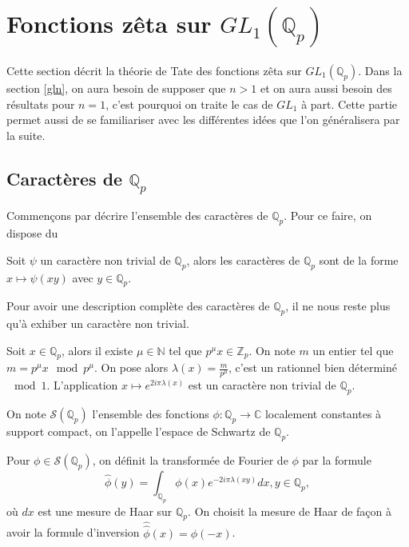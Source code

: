 \section{Fonctions zêta sur $GL_1(\mathbb{Q}_p)$}

Cette section décrit la théorie de Tate \cite{tate} des fonctions zêta sur $GL_1(\mathbb{Q}_p)$. Dans la section \ref{gln}, on aura besoin de supposer que $n > 1$ et on aura aussi besoin des résultats pour $n=1$, c'est pourquoi on traite le cas de $GL_1$ à part. Cette partie permet aussi de se familiariser avec les différentes idées que l'on généralisera par la suite.

\subsection{Caractères de $\mathbb{Q}_p$}
\label{caracqp}
Commençons par décrire l'ensemble des caractères de $\mathbb{Q}_p$. Pour ce faire, on dispose du

\begin{lemme}
Soit $\psi$ un caractère non trivial de $\mathbb{Q}_p$, alors les caractères de $\mathbb{Q}_p$ sont de la forme $x \mapsto \psi(xy)$ avec $y \in \mathbb{Q}_p$.
\end{lemme}

Pour avoir une description complète des caractères de $\mathbb{Q}_p$, il ne nous reste plus qu'à exhiber un caractère non trivial.

Soit $x \in \mathbb{Q}_p$, alors il existe $\mu \in \mathbb{N}$ tel que $p^\mu x \in \mathbb{Z}_p$. On note $m$ un entier tel que $m = p^\mu x \mod p^\mu$. On pose alors $\lambda(x) = \frac{m}{p^\mu}$, c'est un rationnel bien déterminé $\mod 1$. L'application $x \mapsto e^{2i\pi \lambda(x)}$ est un caractère non trivial de $\mathbb{Q}_p$.

On note $\mathcal{S}(\mathbb{Q}_p)$ l'ensemble des fonctions $\phi : \mathbb{Q}_p \rightarrow \mathbb{C}$ localement constantes à support compact, on l'appelle l'espace de Schwartz de $\mathbb{Q}_p$.

Pour $\phi \in \mathcal{S}(\mathbb{Q}_p)$, on définit la transformée de Fourier de $\phi$ par la formule
\begin{equation}
\hat{\phi}(y) = \int_{\mathbb{Q}_p} \phi(x) e^{-2i\pi \lambda(xy)}dx, y \in \mathbb{Q}_p,
\end{equation}
où $dx$ est une mesure de Haar sur $\mathbb{Q}_p$. On choisit la mesure de Haar de façon à avoir la formule d'inversion $\hat{\hat{\phi}}(x)=\phi(-x)$.

